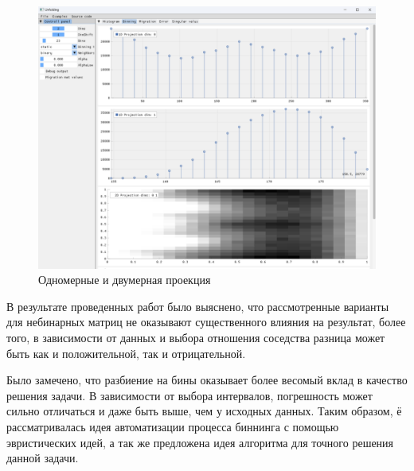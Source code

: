 \documentclass[a4paper,12pt]{diplom}
\begin{document}
\begin{figure}[h!]
   \centering
   \includegraphics[width=\linewidth]{images/binning_projections_example.png}
   \caption{Одномерные и двумерная проекция}
\end{figure}

В результате проведенных работ было выяснено, что рассмотренные варианты для небинарных матриц не оказывают существенного влияния на 
результат, более того, в зависимости от данных и выбора отношения соседства разница может быть как и положительной, так и отрицательной. 

Было замечено, что разбиение на бины оказывает более весомый вклад в качество решения задачи. В зависимости от выбора интервалов, погрешность может 
сильно отличаться и даже быть выше, чем у исходных данных. Таким образом,  ё рассматривалась идея автоматизации процесса биннинга с помощью эвристических 
идей, а так же предложена идея алгоритма для точного решения данной задачи.
\end{document}
